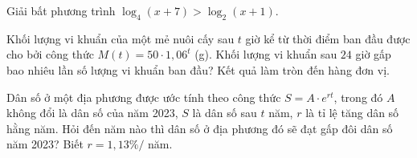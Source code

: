 \begin{bt}%
	Giải bất phương trình $\log_4 (x+7)>\log_2 (x+1)$.
\end{bt}

\begin{ex}%
	Khối lượng vi khuẩn của một mẻ nuôi cấy sau $ t$ giờ kể từ thời điểm ban đầu được cho bởi công thức $M(t)=50\cdot 1{,}06^t$ (g). Khối lượng vi khuẩn sau $24$ giờ gấp bao nhiêu lần số lượng vi khuẩn ban đầu? Kết quả làm tròn đến hàng đơn vị.
\end{ex}

\begin{ex}%
	Dân số ở một địa phương được ước tính theo công thức $S=A\cdot e^{rt}$, trong đó $A$ không đổi là dân số của năm 2023, $S$ là dân số sau $t$ năm, $r$ là tỉ lệ tăng dân số hằng năm. Hỏi đến năm nào thì dân số ở địa phương đó sẽ đạt gấp đôi dân số năm 2023? Biết $r=1,13\% /$ năm.
\end{ex}

